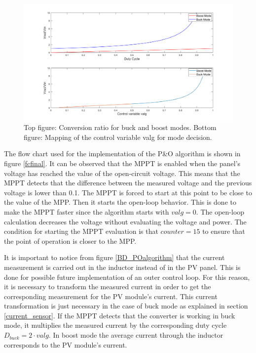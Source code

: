 \begin{figure}[H]
	\begin{center}
		\includegraphics[width=1\textwidth]{../Pictures/decision_mode_operation}
		\caption{Top figure: Conversion ratio for buck and boost modes. Bottom figure: Mapping of the control variable valg for mode decision.}
		\label{fig:mappingtf} 
	\end{center}	
\end{figure}

The flow chart used for the implementation of the P\&O algorithm is shown in figure \ref{fcfinal}. It can be observed that the MPPT is enabled when the panel's voltage has reached the value of the open-circuit voltage. This means that the MPPT detects that the difference between the measured voltage and the previous voltage is lower than 0.1. The MPPT is forced to start at this point to be close to the value of the MPP. 
Then it starts the open-loop behavior. This is done to make the MPPT faster since the algorithm starts with $valg = 0$. The open-loop calculation decreases the voltage without evaluating the voltage and power. The condition for starting the MPPT evaluation is that $counter=15$ to ensure that the point of operation is closer to the MPP. 

It is important to notice from figure \ref{BD_POalgorithm} that the current measurement is carried out in the inductor instead of in the PV panel. This is done for possible future implementation of an outer control loop. For this reason, it is necessary to transform the measured current in order to get the corresponding measurement for the PV module's current. This current transformation is just necessary in the case of buck mode as explained in section \ref{current_sensor}. If the MPPT detects that the converter is working in buck mode, it multiplies the measured current by the corresponding duty cycle $D_{buck}=2\cdot valg$. In boost mode the average current through the inductor corresponds to the PV module's current. 

